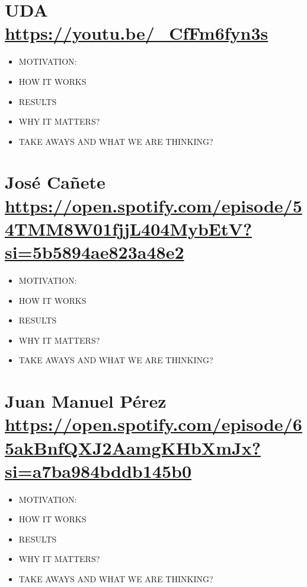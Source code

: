 \documentclass[letter, 11pt, twoside]{report}
\begin{document}
\section*{UDA \color{mirosa}\url{https://youtu.be/_CfFm6fyn3s}}
\begin{itemize}
    \item MOTIVATION:
    \item HOW IT WORKS
    \item RESULTS
    \item WHY IT MATTERS?
    \item TAKE AWAYS AND WHAT WE ARE THINKING?
\end{itemize}
\section*{José Cañete \color{mirosa}\url{https://open.spotify.com/episode/54TMM8W01fjjL404MybEtV?si=5b5894ae823a48e2}}
\begin{itemize}
    \item MOTIVATION:
    \item HOW IT WORKS
    \item RESULTS
    \item WHY IT MATTERS?
    \item TAKE AWAYS AND WHAT WE ARE THINKING?
\end{itemize}
\section*{Juan Manuel Pérez  \color{mirosa}\url{https://open.spotify.com/episode/65akBnfQXJ2AamgKHbXmJx?si=a7ba984bddb145b0}}
\begin{itemize}
    \item MOTIVATION:
    \item HOW IT WORKS
    \item RESULTS
    \item WHY IT MATTERS?
    \item TAKE AWAYS AND WHAT WE ARE THINKING?
\end{itemize}

  




\end{document}
